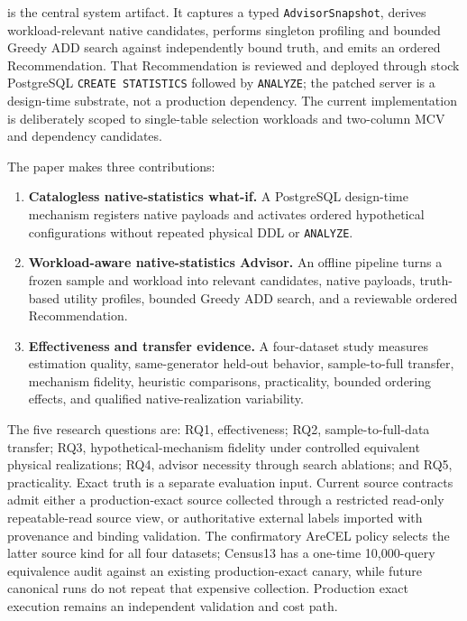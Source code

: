\advisor is the central system artifact. It captures a typed
\texttt{AdvisorSnapshot}, derives workload-relevant native candidates, performs
singleton profiling and bounded Greedy ADD search against independently bound
truth, and emits an ordered Recommendation. That Recommendation is reviewed
and deployed through stock PostgreSQL \texttt{CREATE STATISTICS} followed by
\texttt{ANALYZE}; the patched server is a design-time substrate, not a
production dependency. The current implementation is deliberately scoped to
single-table selection workloads and two-column MCV and dependency candidates.

The paper makes three contributions:

\begin{enumerate}
  \item \textbf{Catalogless native-statistics what-if.} A PostgreSQL
  design-time mechanism registers native payloads and activates ordered
  hypothetical configurations without repeated physical DDL or \texttt{ANALYZE}.
  \item \textbf{Workload-aware native-statistics Advisor.} An offline pipeline
  turns a frozen sample and workload into relevant candidates, native payloads,
  truth-based utility profiles, bounded Greedy ADD search, and a reviewable
  ordered Recommendation.
  \item \textbf{Effectiveness and transfer evidence.} A four-dataset study
  measures estimation quality, same-generator held-out behavior, sample-to-full
  transfer, mechanism fidelity, heuristic comparisons, practicality, bounded
  ordering effects, and qualified native-realization variability.
\end{enumerate}

The five research questions are: RQ1, effectiveness; RQ2, sample-to-full-data
transfer; RQ3, hypothetical-mechanism fidelity under controlled equivalent
physical realizations; RQ4, advisor necessity through search ablations; and
RQ5, practicality. Exact truth is a separate evaluation input. Current source
contracts admit either a production-exact source collected through a restricted
read-only repeatable-read source view, or authoritative external labels
imported with provenance and binding validation. The confirmatory AreCEL policy selects the latter source kind for
all four datasets; Census13 has a one-time 10,000-query equivalence audit
against an existing production-exact canary, while future canonical runs do
not repeat that expensive collection. Production exact execution remains an
independent validation and cost path.


